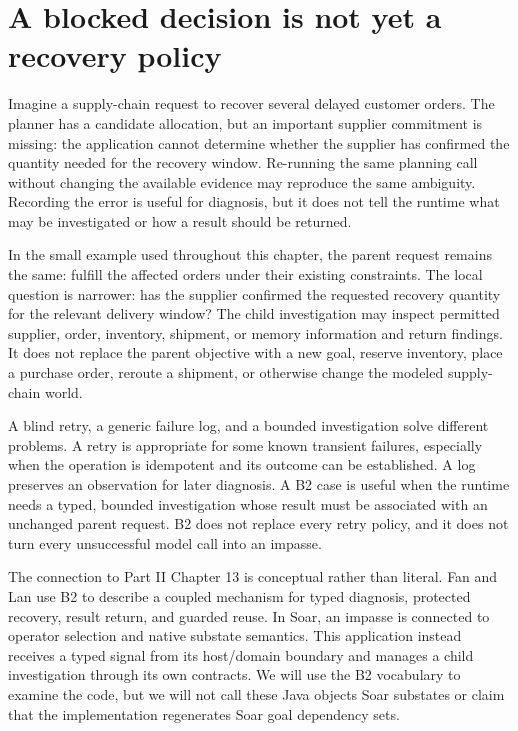 \section{A blocked decision is not yet a recovery policy}
\label{sec:ch22-blocked-decision}

Imagine a supply-chain request to recover several delayed customer orders. The planner has a candidate allocation, but an important supplier commitment is missing: the application cannot determine whether the supplier has confirmed the quantity needed for the recovery window. Re-running the same planning call without changing the available evidence may reproduce the same ambiguity. Recording the error is useful for diagnosis, but it does not tell the runtime what may be investigated or how a result should be returned.

\BookExampleLabel{} In the small example used throughout this chapter, the parent request remains the same: fulfill the affected orders under their existing constraints. The local question is narrower: has the supplier confirmed the requested recovery quantity for the relevant delivery window? The child investigation may inspect permitted supplier, order, inventory, shipment, or memory information and return findings. It does not replace the parent objective with a new goal, reserve inventory, place a purchase order, reroute a shipment, or otherwise change the modeled supply-chain world.

A blind retry, a generic failure log, and a bounded investigation solve different problems. A retry is appropriate for some known transient failures, especially when the operation is idempotent and its outcome can be established. A log preserves an observation for later diagnosis. A B2 case is useful when the runtime needs a typed, bounded investigation whose result must be associated with an unchanged parent request. B2 does not replace every retry policy, and it does not turn every unsuccessful model call into an impasse.

The connection to Part II Chapter 13 is conceptual rather than literal. Fan and Lan use B2 to describe a coupled mechanism for typed diagnosis, protected recovery, result return, and guarded reuse. In Soar, an impasse is connected to operator selection and native substate semantics. This application instead receives a typed signal from its host/domain boundary and manages a child investigation through its own contracts. We will use the B2 vocabulary to examine the code, but we will not call these Java objects Soar substates or claim that the implementation regenerates Soar goal dependency sets.

